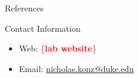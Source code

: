 \documentclass[final,hyperref={pdfpagelabels=false}]{beamer}
\newcommand{\todo}[1]{\textcolor{red}{\{\textbf{#1}\}}}
\begin{document}
\begin{frame}[t]
\begin{columns}[t]
\begin{column}{.3\textwidth}
\begin{block}{References}
        
\small{
}

\end{block}


\begin{block}{Contact Information}

\begin{itemize}
\item Web: \todo{lab website}
\item Email: \href{mailto:nicholas.konz@duke.edu}{nicholas.konz@duke.edu}
\end{itemize}

\end{block}
\end{column} %


\begin{column}{.015\textwidth}\end{column} %

\end{columns} %

\end{frame} %
\end{document}
